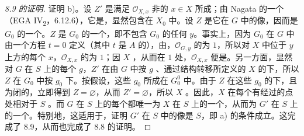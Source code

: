 \begin{proof}[8.9 的证明]
证明 b)。设 $Z'$ 是满足 $\mathcal O_{X,x}$ 非的 $x\in X$ 所成；由 Nagata 的一个（EGA IV\textsubscript{2}，6.12.6），它是，显然包含在 $X_0$ 中。设 $Z$ 是它在 $G$ 中的像，因而是 $G_0$ 的一个。$Z$ 是 $G_0$ 的一个，即不包含 $G_0$ 的任何 $y$。事实上，因为 $G_0$ 在 $G$ 中由一个方程 $t=0$ 定义（其中 $t$ 是 $A$ 的），由，$\mathcal O_{G,y}$ 的为 $1$，所以对 $X$ 中位于 $y$ 上方的每个 $x$，$\mathcal O_{X,x}$ 的为 $1$；因 $X$ ，从而在 $1$ 处，$\mathcal O_{X,x}$ 便是。另一方面，显然对 $G$ 在 $S$ 上的每个 $g$，$Z'$ 在由 $G$ 中按 $g$ 、通过结构转移所定义的 $X$ 的下，所以 $Z$ 在 $G_0$ 中按 $g_0$ 下。按假设，这些 $g_0$ 所成在 $G_0^0$ 中。由于 $Z$ 在这些 $g_0$ 的下，且为闭的，立即得到 $Z=\varnothing$，从而 $Z'=\varnothing$，所以 $X$ 。因此，$X$ 在每个有经过的点处相对于 $S$ 。而 $G$ 在 $S$ 上的每个都唯一为 $X$ 在 $S$ 上的一个，从而为 $G'$ 在 $S$ 上的一个。特别地，这适用于，证明 $G'$ 在 $S$ 中的像是 $S$，即 a) 的条件成立。这完成了 8.9，从而也完成了 8.8 的证明。
\end{proof}

